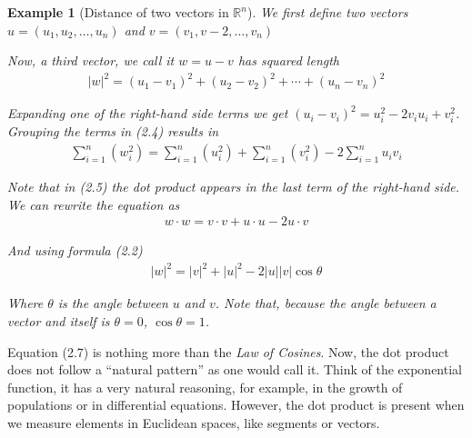 \documentclass{book}
\newtheorem{example}{Example}[section]
\begin{document}
\begin{example}[Distance of two vectors in $\mathbb{R}^{n}$]
    We first define two vectors $u=\left(u_1,u_2,\dots,u_n\right)$ and $v=\left(v_1, v-2, \dots, v_n\right)$

    Now, a third vector, we call it $w=u-v$ has squared length
    \begin{equation}
        \begin{split}
            |w|^{2} = (u_1-v_1)^{2} + (u_2-v_2)^{2} + \cdots + (u_n-v_n)^{2}
        \end{split}
    \end{equation}

    Expanding one of the right-hand side terms we get $\left(u_i-v_i\right)^{2} =
        u_i^{2} - 2 v_i u_i + v_i^{2}$. Grouping the terms in (2.4) results in
    \begin{equation}
        \begin{split}
            \sum_{i=1}^{n}{\left(w_i^{2}\right)} = \sum_{i=1}^{n}{\left(u_i^{2}\right)} + \sum_{i=1}^{n}{\left(v_i^{2}\right)} - 2 \sum_{i=1}^{n}{u_i v_i}
        \end{split}
    \end{equation}

    Note that in (2.5) the dot product appears in the last term of the right-hand
    side. We can rewrite the equation as
    \begin{equation}
        \begin{split}
            w \cdot w = v \cdot v + u \cdot u - 2u \cdot v
        \end{split}
    \end{equation}

    And using formula (2.2)
    \begin{equation}
        \begin{split}
            |w|^{2} = |v|^{2} + |u|^{2} - 2|u||v|\cos\theta
        \end{split}
    \end{equation}

    Where $\theta$ is the angle between $u$ and $v$. Note that, because the angle
    between a vector and itself is $\theta = 0$, $\cos\theta = 1$.
\end{example}

Equation (2.7) is nothing more than the \textit{Law of Cosines}. Now, the dot
product does not follow a ``natural pattern'' as one would call it. Think of
the exponential function, it has a very natural reasoning, for example, in the
growth of populations or in differential equations. However, the dot product is
present when we measure elements in Euclidean spaces, like segments or vectors.
\end{document}

